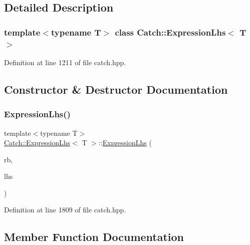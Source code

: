 \subsection{Detailed Description}
\subsubsection*{template$<$typename T$>$\newline
class Catch\+::\+Expression\+Lhs$<$ T $>$}



Definition at line 1211 of file catch.\+hpp.



\subsection{Constructor \& Destructor Documentation}
\hypertarget{class_catch_1_1_expression_lhs_aa829588def6146a94fb75de9c4cc482a}{}\label{class_catch_1_1_expression_lhs_aa829588def6146a94fb75de9c4cc482a} 
\subsubsection{\texorpdfstring{Expression\+Lhs()}{ExpressionLhs()}}
{\footnotesize\ttfamily template$<$typename T$>$ \\
\hyperlink{class_catch_1_1_expression_lhs}{Catch\+::\+Expression\+Lhs}$<$ T $>$\+::\hyperlink{class_catch_1_1_expression_lhs}{Expression\+Lhs} (\begin{DoxyParamCaption}\item[{\hyperlink{class_catch_1_1_result_builder}{Result\+Builder} \&}]{rb,  }\item[{T}]{lhs }\end{DoxyParamCaption})\hspace{0.3cm}{\ttfamily [inline]}}



Definition at line 1809 of file catch.\+hpp.



\subsection{Member Function Documentation}
\hypertarget{class_catch_1_1_expression_lhs_a13d2551a927790284fb5ddf1ee2c9079}{}\label{class_catch_1_1_expression_lhs_a13d2551a927790284fb5ddf1ee2c9079} 

